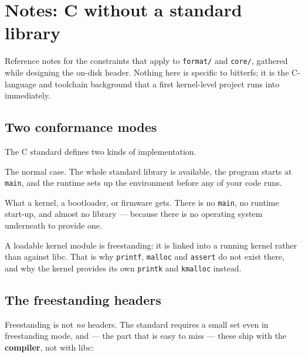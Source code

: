 \chapter{Notes: C without a standard library}
\label{ch:freestanding}

Reference notes for the constraints that apply to \lstinline|format/| and
\lstinline|core/|, gathered while designing the on-disk header. Nothing here is
specific to bitterfs; it is the C-language and toolchain background that a first
kernel-level project runs into immediately.

\section{Two conformance modes}
\label{sec:freestanding-hosted}

The C standard defines two kinds of implementation.

\begin{description}[leftmargin=2.5cm,style=nextline]
  \item[Hosted] The normal case. The whole standard library is available, the
    program starts at \lstinline|main|, and the runtime sets up the environment
    before any of your code runs.
  \item[Freestanding] What a kernel, a bootloader, or firmware gets. There is no
    \lstinline|main|, no runtime start-up, and almost no library --- because
    there is no operating system underneath to provide one.
\end{description}

A loadable kernel module is freestanding: it is linked into a running kernel
rather than against libc. That is why \lstinline|printf|, \lstinline|malloc| and
\lstinline|assert| do not exist there, and why the kernel provides its own
\lstinline|printk| and \lstinline|kmalloc| instead.

\section{The freestanding headers}
\label{sec:freestanding-headers}

Freestanding is not \emph{no} headers. The standard requires a small set even in
freestanding mode, and --- the part that is easy to miss --- these ship with the
\textbf{compiler}, not with libc:

